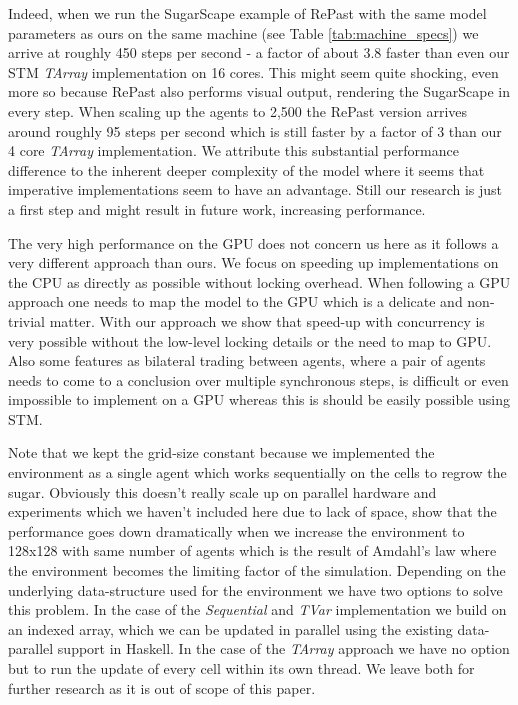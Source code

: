 Indeed, when we run the SugarScape example of RePast with the same model parameters as ours on the same machine (see Table \ref{tab:machine_specs}) we arrive at roughly 450 steps per second - a factor of about 3.8 faster than even our STM \textit{TArray} implementation on 16 cores. This might seem quite shocking, even more so because RePast also performs visual output, rendering the SugarScape in every step. When scaling up the agents to 2,500 the RePast version arrives around roughly 95 steps per second which is still faster by a factor of 3 than our 4 core \textit{TArray} implementation. We attribute this substantial performance difference to  the inherent deeper complexity of the model where it seems that imperative implementations seem to have an advantage. Still our research is just a first step and might result in future work, increasing performance.

The very high performance on the GPU does not concern us here as it follows a very different approach than ours. We focus on speeding up implementations on the CPU as directly as possible without locking overhead. When following a GPU approach one needs to map the model to the GPU which is a delicate and non-trivial matter. With our approach we show that speed-up with concurrency is very possible without the low-level locking details or the need to map to GPU. Also some features as bilateral trading between agents, where a pair of agents needs to come to a conclusion over multiple synchronous steps, is difficult or even impossible to implement on a GPU whereas this is should be easily possible using STM.

Note that we kept the grid-size constant because we implemented the environment as a single agent which works sequentially on the cells to regrow the sugar. Obviously this doesn't really scale up on parallel hardware and experiments which we haven't included here due to lack of space, show that the performance goes down dramatically when we increase the environment to 128x128 with same number of agents which is the result of Amdahl's law where the environment becomes the limiting factor of the simulation. Depending on the underlying data-structure used for the environment we have two options to solve this problem. In the case of the \textit{Sequential} and \textit{TVar} implementation we build on an indexed array, which we can be updated in parallel using the existing data-parallel support in Haskell. In the case of the \textit{TArray} approach we have no option but to run the update of every cell within its own thread. We leave both for further research as it is out of scope of this paper.

